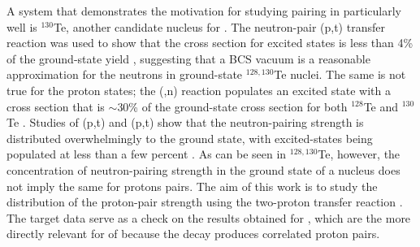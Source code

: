 A system that demonstrates the motivation for studying pairing in  particularly well is $^{130}$Te, another candidate nucleus for \zvbb.  The neutron-pair (p,t) transfer reaction was used to show that the cross section for excited \zp states is less than 4\% of the ground-state yield \citep{neutronPairsTellurium}, suggesting that a BCS vacuum is a reasonable approximation for the neutrons in ground-state $^{128,130}$Te nuclei.  The same is not true for the proton states; the (,n) reaction populates an excited \zp state with a cross section that is $\sim$30\% of the ground-state cross section for both $^{128}$Te and $^{130}$Te \citep{protonPairsTellurium}.  Studies of (p,t) and (p,t) show that the neutron-pairing strength is distributed overwhelmingly to the ground state, with excited-\zp states being populated at less than a few percent \citep{neutronPairsGermanium}.  As can be seen in $^{128,130}$Te, however, the concentration of neutron-pairing strength in the ground state of a nucleus does not imply the same for protons pairs.  The aim of this work is to study the distribution of the proton-pair strength using the two-proton transfer reaction \reaction.  The  target data serve as a check on the results obtained for , which are the more directly relevant for \zvbb of  because the decay produces correlated proton pairs. 

